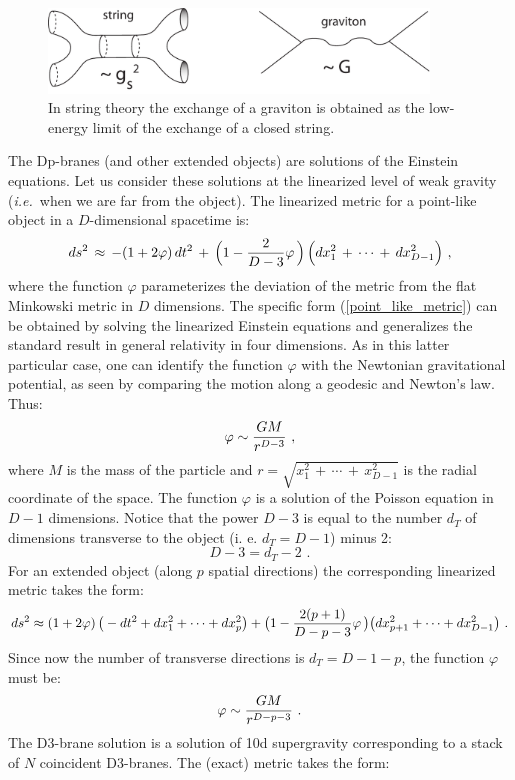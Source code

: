 \documentclass[12pt,notitlepage,a4paper]{article}
\newcommand{\beq}{\begin{equation}}
\newcommand{\eeq}{\end{equation}}
\def\ie{{\emph{i.e.}}}
\begin{document}
\begin{figure}[ht]
\center
\includegraphics[width=0.9\textwidth]{graviton.pdf}
\caption{In string theory the exchange of a graviton is obtained as the low-energy limit of the exchange of a closed string. } 
\label{Newton_string.pdf}
\end{figure}



The Dp-branes (and other extended objects) are solutions of the Einstein equations. Let us consider these solutions at the linearized level of weak gravity (\ie\ when we are far from the object). The linearized metric for a point-like object in a $D$-dimensional  spacetime is:
\beq
ds^2\,\approx\,-(1+2\varphi)\,dt^2\,+\,\Big(1-{2\over D-3}\varphi\,\Big)\,
\Big(dx_1^2\,+\,\cdots\,+\, dx_{D-1}^2\Big)\,\,,
\label{point_like_metric}
\eeq
where the function  $\varphi$ parameterizes the deviation of the metric from the flat Minkowski metric in $D$ dimensions. The specific form (\ref{point_like_metric}) can be obtained by solving the linearized Einstein equations and generalizes the standard result in general relativity  in four dimensions. As in this latter particular case, one can identify the function $\varphi$ with
the Newtonian gravitational potential, as seen by comparing the motion along a geodesic and Newton's law. Thus:
\beq
\varphi\sim {GM\over r^{D-3}}\,\,,
\eeq
where $M$ is  the mass of the particle and  $r=\sqrt{x_1^2\,+\,\cdots\,+\, x_{D-1}^2}$  is the radial coordinate of the space. The function  $\varphi$ is a solution of the Poisson equation in $D-1$ dimensions. Notice that the power $D-3$ is equal to the number $d_T$ of dimensions transverse to the object (i. e.   $d_T=D-1$) minus 2:
\beq
D-3=d_T-2\,\,.
\eeq
For an extended object (along $p$ spatial directions)  the corresponding linearized metric takes the form:
\beq
ds^2\approx(1+2\varphi)\,\big(-dt^2+dx_1^2+\cdots+ dx_{p}^2\big)+
\big(1-{2(p+1)\over D-p-3}\varphi\,\big)
\big(dx_{p+1}^2+\cdots+ dx_{D-1}^2\big)\,\,.
\label{extended_metric}
\eeq
Since now the number of transverse directions is $d_T=D-1-p$, the function  $\varphi$ must be:
\beq
\varphi\sim {GM\over r^{D-p-3}}\,\,.
\label{extended_potential}
\eeq
The  D3-brane solution is a solution of 10d supergravity corresponding to a stack of $N$ coincident D3-branes. The (exact) metric takes the form:
\end{document}
